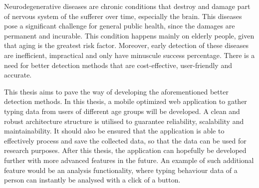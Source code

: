 






Neurodegenerative diseases are chronic conditions that destroy and damage part of nervous system of the sufferer over time, especially the brain. 
This diseases pose a significant challenge for general public health, since the damages are permanent and incurable. 
This condition happens mainly on elderly people, given that aging is the greatest risk factor. 
Moreover, early detection of these diseases are inefficient, impractical and only have minuscule success percentage. 
There is a need for better detection methods that are cost-effective, user-friendly and accurate.

This thesis aims to pave the way of developing the aforementioned better detection methods.
In this thesis, a mobile optimized web application to gather typing data from users of different age groups will be developed. 
A clean and robust architecture structure is utilised to guarantee reliability, scalability and maintainability. 
It should also be ensured that the application is able to effectively process and save the collected data, so that the data can be used for research purposes.
After this thesis, the application can hopefully be developed further with more advanced features in the future. 
An example of such additional feature would be an analysis functionality, where typing behaviour data of a person can instantly be analysed with a click of a button.


